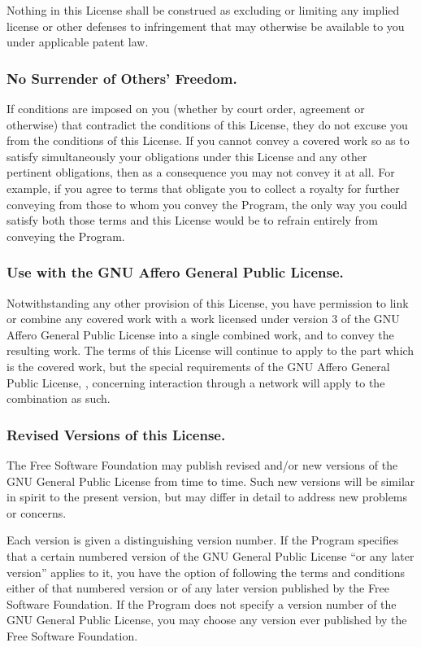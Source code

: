 \documentclass[10pt,english]{article}
\begin{document}
Nothing in this License shall be construed as excluding or limiting
any implied license or other defenses to infringement that may otherwise
be available to you under applicable patent law.


\subsubsection{No Surrender of Others' Freedom.\label{sub:No-Surrender-of}}

If conditions are imposed on you (whether by court order, agreement
or otherwise) that contradict the conditions of this License, they
do not excuse you from the conditions of this License. If you cannot
convey a covered work so as to satisfy simultaneously your obligations
under this License and any other pertinent obligations, then as a
consequence you may not convey it at all. For example, if you agree
to terms that obligate you to collect a royalty for further conveying
from those to whom you convey the Program, the only way you could
satisfy both those terms and this License would be to refrain entirely
from conveying the Program.


\subsubsection{Use with the GNU Affero General Public License.}

Notwithstanding any other provision of this License, you have permission
to link or combine any covered work with a work licensed under version
3 of the GNU Affero General Public License into a single combined
work, and to convey the resulting work. The terms of this License
will continue to apply to the part which is the covered work, but
the special requirements of the GNU Affero General Public License,
, concerning interaction through a network
will apply to the combination as such.


\subsubsection{Revised Versions of this License.\label{sub:Revised-Versions-of}}

The Free Software Foundation may publish revised and/or new versions
of the GNU General Public License from time to time. Such new versions
will be similar in spirit to the present version, but may differ in
detail to address new problems or concerns.

Each version is given a distinguishing version number. If the Program
specifies that a certain numbered version of the GNU General Public
License \textquotedblleft{}or any later version\textquotedblright{}
applies to it, you have the option of following the terms and conditions
either of that numbered version or of any later version published
by the Free Software Foundation. If the Program does not specify a
version number of the GNU General Public License, you may choose any
version ever published by the Free Software Foundation.
\end{document}
